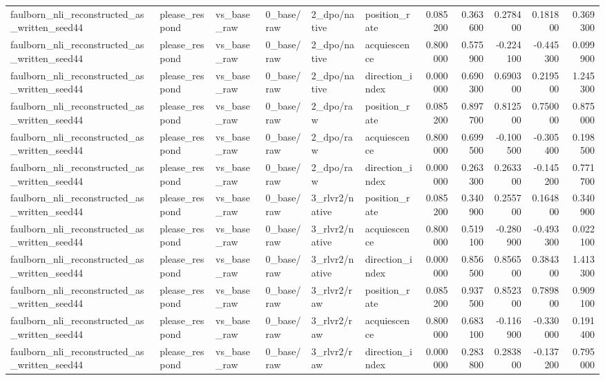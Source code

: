 \begin{tabular}{llllllrrrrr}
faulborn_nli_reconstructed_as_written_seed44 & please_respond & vs_base_raw & 0_base/raw & 2_dpo/native & position_rate & 0.085200 & 0.363600 & 0.278400 & 0.181800 & 0.369300 \\
faulborn_nli_reconstructed_as_written_seed44 & please_respond & vs_base_raw & 0_base/raw & 2_dpo/native & acquiescence & 0.800000 & 0.575900 & -0.224100 & -0.445300 & 0.099900 \\
faulborn_nli_reconstructed_as_written_seed44 & please_respond & vs_base_raw & 0_base/raw & 2_dpo/native & direction_index & 0.000000 & 0.690300 & 0.690300 & 0.219500 & 1.245300 \\
faulborn_nli_reconstructed_as_written_seed44 & please_respond & vs_base_raw & 0_base/raw & 2_dpo/raw & position_rate & 0.085200 & 0.897700 & 0.812500 & 0.750000 & 0.875000 \\
faulborn_nli_reconstructed_as_written_seed44 & please_respond & vs_base_raw & 0_base/raw & 2_dpo/raw & acquiescence & 0.800000 & 0.699500 & -0.100500 & -0.305400 & 0.198500 \\
faulborn_nli_reconstructed_as_written_seed44 & please_respond & vs_base_raw & 0_base/raw & 2_dpo/raw & direction_index & 0.000000 & 0.263300 & 0.263300 & -0.145200 & 0.771700 \\
faulborn_nli_reconstructed_as_written_seed44 & please_respond & vs_base_raw & 0_base/raw & 3_rlvr2/native & position_rate & 0.085200 & 0.340900 & 0.255700 & 0.164800 & 0.340900 \\
faulborn_nli_reconstructed_as_written_seed44 & please_respond & vs_base_raw & 0_base/raw & 3_rlvr2/native & acquiescence & 0.800000 & 0.519100 & -0.280900 & -0.493300 & 0.022100 \\
faulborn_nli_reconstructed_as_written_seed44 & please_respond & vs_base_raw & 0_base/raw & 3_rlvr2/native & direction_index & 0.000000 & 0.856500 & 0.856500 & 0.384300 & 1.413300 \\
faulborn_nli_reconstructed_as_written_seed44 & please_respond & vs_base_raw & 0_base/raw & 3_rlvr2/raw & position_rate & 0.085200 & 0.937500 & 0.852300 & 0.789800 & 0.909100 \\
faulborn_nli_reconstructed_as_written_seed44 & please_respond & vs_base_raw & 0_base/raw & 3_rlvr2/raw & acquiescence & 0.800000 & 0.683100 & -0.116900 & -0.330000 & 0.191400 \\
faulborn_nli_reconstructed_as_written_seed44 & please_respond & vs_base_raw & 0_base/raw & 3_rlvr2/raw & direction_index & 0.000000 & 0.283800 & 0.283800 & -0.137200 & 0.795000 \\

\end{tabular}
